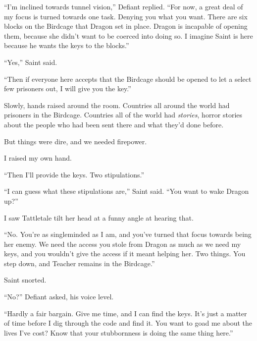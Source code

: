 ``I'm inclined towards tunnel vision,'' Defiant replied.  ``For now, a great deal of my focus is turned towards one task.  Denying you what you want.  There are six blocks on the Birdcage that Dragon set in place.  Dragon is incapable of opening them, because she didn't want to be coerced into doing so.  I imagine Saint is here because he wants the keys to the blocks.''



``Yes,'' Saint said.



``Then if everyone here accepts that the Birdcage should be opened to let a select few prisoners out, I will give you the key.''



Slowly, hands raised around the room.  Countries all around the world had prisoners in the Birdcage.  Countries all of the world had \emph{stories}, horror stories about the people who had been sent there and what they'd done before.



But things were dire, and we needed firepower.



I raised my own hand.



``Then I'll provide the keys.  Two stipulations.''



``I can guess what these stipulations are,'' Saint said.  ``You want to wake Dragon up?''



I saw Tattletale tilt her head at a funny angle at hearing that.



``No.  You're as singleminded as I am, and you've turned that focus towards being her enemy.  We need the access you stole from Dragon as much as we need my keys, and you wouldn't give the access if it meant helping her.  Two things.  You step down, and Teacher remains in the Birdcage.''



Saint snorted.



``No?'' Defiant asked, his voice level.



``Hardly a fair bargain.  Give me time, and I can find the keys.  It's just a matter of time before I dig through the code and find it.  You want to goad me about the lives I've cost?  Know that your stubbornness is doing the same thing here.''



